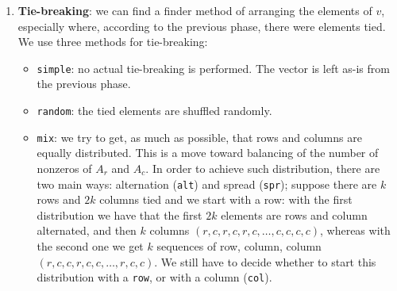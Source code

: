 \begin{enumerate}
 \item \textbf{Tie-breaking}: we can find a finder method of arranging the elements of $v$, especially where, according to the previous phase, there were elements tied. We use three methods for tie-breaking:
 
 \begin{itemize}
  \item \verb|simple|: no actual tie-breaking is performed. The vector is left as-is from the previous phase.
  \item \verb|random|: the tied elements are shuffled randomly.
  \item \verb|mix|: we try to get, as much as possible, that rows and columns are equally distributed. This is a move toward balancing of the number of nonzeros of $A_r$ and $A_c$. In order to achieve such distribution, there are two main ways: alternation (\verb|alt|) and spread (\verb|spr|); suppose there are $k$ rows and $2k$ columns tied and we start with a row: with the first distribution we have that the first $2k$ elements are rows and column alternated, and then $k$ columns $(r,c,r,c,r,c,\dots,c,c,c,c)$, whereas with the second one we get $k$ sequences of row, column, column $(r,c,c,r,c,c,\dots,r,c,c)$. We still have to decide whether to start this distribution with a \verb|row|, or with a column (\verb|col|).
 \end{itemize}

\end{enumerate}



